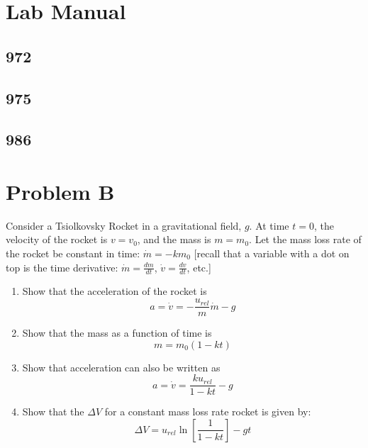 \documentclass{article}
\begin{document}
\section{Lab Manual}

\subsection{972}

\subsection{975}

\subsection{986}

\section{Problem B}

Consider a Tsiolkovsky Rocket in a gravitational field, $ g $. At time $ t = 0 $, the velocity of the rocket is $ v = v_0 $, and the mass is $ m = m_0 $. Let the mass loss rate of the rocket be constant in time: $ \dot{m} = -km_0 $ [recall that a variable with a dot on top is the time derivative: $ \dot{m} = \frac{dm}{dt} $, $ \dot{v} = \frac{dv}{dt} $, etc.]
\begin{enumerate}[label = \textbf{\arabic*.}]
	\item Show that the acceleration of the rocket is
		\begin{equation*}
			a = \dot{v} = -\frac{u_{rel}}{m}\dot{m} - g
		\end{equation*}
	\item Show that the mass as a function of time is
		\begin{equation*}
			m = m_0(1 - kt)
		\end{equation*}
	\item Show that acceleration can also be written as
		\begin{equation*}
			a = \dot{v} = \frac{ku_{rel}}{1 - kt} - g
		\end{equation*}
	\item Show that the $ \Delta V $ for a constant mass loss rate rocket is given by:
		\begin{equation*}
			\Delta V = u_{rel}\ln \left[ \frac{1}{1 - kt} \right] - gt
		\end{equation*}
\end{enumerate}
\end{document}
